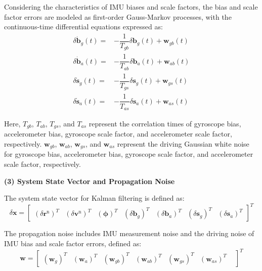 \documentclass{article}
\begin{document}
Considering the characteristics of IMU biases and scale factors, the bias and scale factor errors are modeled as first-order Gauss-Markov processes, with the continuous-time differential equations expressed as:
\begin{equation}
    \begin{aligned}
        \delta \dot{\boldsymbol{b}}_{g}({t}) = & -{\dfrac{1}{{T}_{gb}}} \delta \boldsymbol{b}_{g}({t}) + \boldsymbol{w}_{gb}({t}) \\
        \delta \dot{\boldsymbol{b}}_{a}({t}) = & -{\dfrac{1}{{T}_{ab}}} \delta \boldsymbol{b}_{a}({t}) + \boldsymbol{w}_{ab}({t}) \\
        \delta \dot{\boldsymbol{s}}_{g}({t}) = & -{\dfrac{1}{{T}_{gs}}} \delta \boldsymbol{s}_{g}({t}) + \boldsymbol{w}_{gs}({t}) \\
        \delta \dot{\boldsymbol{s}}_{a}({t}) = & -{\dfrac{1}{{T}_{as}}} \delta \boldsymbol{s}_{a}({t}) + \boldsymbol{w}_{as}({t})
    \end{aligned}
    \label{eq:imu-error-difference-equations}
\end{equation}

Here, ${T}_{gb}$, ${T}_{ab}$, ${T}_{gs}$, and ${T}_{as}$ represent the correlation times of gyroscope bias, accelerometer bias, gyroscope scale factor, and accelerometer scale factor, respectively. $\boldsymbol{w}_{gb}$, $\boldsymbol{w}_{ab}$, $\boldsymbol{w}_{gs}$, and $\boldsymbol{w}_{as}$ represent the driving Gaussian white noise for gyroscope bias, accelerometer bias, gyroscope scale factor, and accelerometer scale factor, respectively.

\textbf{(3) System State Vector and Propagation Noise}

The system state vector for Kalman filtering is defined as:
\begin{equation}
    \delta \boldsymbol{x} = \left[ \begin{matrix}
        \left(\delta \boldsymbol{r}^{{\mathrm{n}}} \right)^{T}& 
        \left(\delta \boldsymbol{v}^{{\mathrm{n}}} \right)^{T}& 
        \left(\boldsymbol{\phi} \right)^{T}& 
        \left(\delta \boldsymbol{b}_{{g}} \right)^{T}& 
        \left(\delta \boldsymbol{b}_{{a}} \right)^{T}& 
        \left(\delta \boldsymbol{s}_{{g}} \right)^{T}& 
        \left(\delta \boldsymbol{s}_{{a}} \right)^{T}
    \end{matrix} \right]^{T}
\end{equation}

The propagation noise includes IMU measurement noise and the driving noise of IMU bias and scale factor errors, defined as:
\begin{equation}
    \boldsymbol{w} = \begin{bmatrix}
        \left(\boldsymbol{w}_{g}\right)^{T} &
        \left(\boldsymbol{w}_{a}\right)^{T} &
        \left(\boldsymbol{w}_{gb}\right)^{T} &
        \left(\boldsymbol{w}_{ab}\right)^{T} &
        \left(\boldsymbol{w}_{gs}\right)^{T} &
        \left(\boldsymbol{w}_{as}\right)^{T} &
    \end{bmatrix}^{T}
    \label{eq:INS-propagation-noise-definition}
\end{equation}
\end{document}
